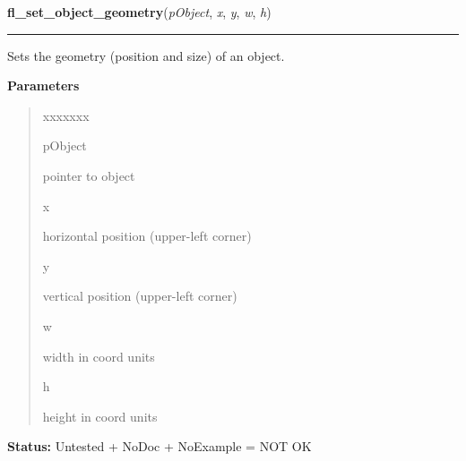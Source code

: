 \hspace{.8\funcindent}\begin{boxedminipage}{\funcwidth}

    \raggedright \textbf{fl\_set\_object\_geometry}(\textit{pObject}, \textit{x}, \textit{y}, \textit{w}, \textit{h})

    \vspace{-1.5ex}

    \rule{\textwidth}{0.5\fboxrule}
\setlength{\parskip}{2ex}
    Sets the geometry (position and size) of an object.

\setlength{\parskip}{1ex}
      \textbf{Parameters}
      \vspace{-1ex}

      \begin{quote}
        \begin{Ventry}{xxxxxxx}

          \item[pObject]

          pointer to object

          \item[x]

          horizontal position (upper-left corner)

          \item[y]

          vertical position (upper-left corner)

          \item[w]

          width in coord units

          \item[h]

          height in coord units

        \end{Ventry}

      \end{quote}

\textbf{Status:} Untested + NoDoc + NoExample = NOT OK



    \end{boxedminipage}

    \label{xformslib:library:fl_move_object}

    \vspace{0.5ex}

